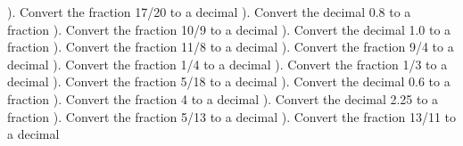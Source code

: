 \documentclass{article}%
\begin{document}
). Convert the fraction 17/20 to a decimal%
\newline%
\newline%
). Convert the decimal 0.8 to a fraction%
\newline%
\newline%
). Convert the fraction 10/9 to a decimal%
\newline%
\newline%
). Convert the decimal 1.0 to a fraction%
\newline%
\newline%
). Convert the fraction 11/8 to a decimal%
\newline%
\newline%
). Convert the fraction 9/4 to a decimal%
\newline%
\newline%
). Convert the fraction 1/4 to a decimal%
\newline%
\newline%
). Convert the fraction 1/3 to a decimal%
\newline%
\newline%
). Convert the fraction 5/18 to a decimal%
\newline%
\newline%
). Convert the decimal 0.6 to a fraction%
\newline%
\newline%
). Convert the fraction 4 to a decimal%
\newline%
\newline%
). Convert the decimal 2.25 to a fraction%
\newline%
\newline%
). Convert the fraction 5/13 to a decimal%
\newline%
\newline%
). Convert the fraction 13/11 to a decimal%
\end{document}
